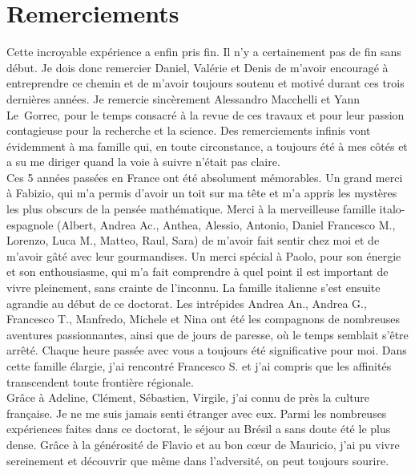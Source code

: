 \chapter*{Remerciements}

Cette incroyable expérience a enfin pris fin. Il n'y a certainement pas de fin sans début. Je dois donc remercier Daniel, Valérie et Denis de m'avoir encouragé à entreprendre ce chemin et de m'avoir toujours soutenu et motivé durant ces trois dernières années. Je remercie sincèrement Alessandro Macchelli et Yann Le~Gorrec, pour le temps consacré à la revue de ces travaux et pour leur passion contagieuse pour la recherche et la science. Des remerciements infinis vont évidemment à ma famille qui, en toute circonstance, a toujours été à mes côtés et a su me diriger quand la voie à suivre n'était pas claire. \\

Ces 5 années passées en France ont été absolument mémorables. Un grand merci à Fabizio, qui m'a permis d'avoir un toit sur ma t\^ete et m'a appris les mystères les plus obscurs de la pensée mathématique. Merci à la merveilleuse famille italo-espagnole (Albert, Andrea Ac., Anthea, Alessio, Antonio, Daniel Francesco M., Lorenzo, Luca M., Matteo, Raul, Sara) de m'avoir fait sentir chez moi et de m'avoir gâté avec leur gourmandises. Un merci spécial à Paolo, pour son énergie et son enthousiasme, qui m'a fait comprendre à quel point il est important de vivre pleinement, sans crainte de l'inconnu. La famille italienne s'est ensuite agrandie au début de ce doctorat. Les intrépides Andrea An., Andrea G., Francesco T., Manfredo, Michele et Nina ont été les compagnons de nombreuses aventures passionnantes, ainsi que de jours de paresse, où le temps semblait s'être arrêté. Chaque heure passée avec vous a toujours été significative pour moi. Dans cette famille élargie, j'ai rencontré Francesco S. et j'ai compris que les affinités transcendent toute frontière régionale. \\

Grâce à Adeline, Clément, Sébastien, Virgile, j'ai connu de près la culture française. Je ne me suis jamais senti étranger avec eux. Parmi les nombreuses expériences faites dans ce doctorat, le séjour au Brésil a sans doute été le plus dense. Grâce à la générosité de Flavio et au bon c\oe{}ur de Mauricio, j'ai pu vivre sereinement et découvrir que même dans l'adversité, on peut toujours sourire. \\

